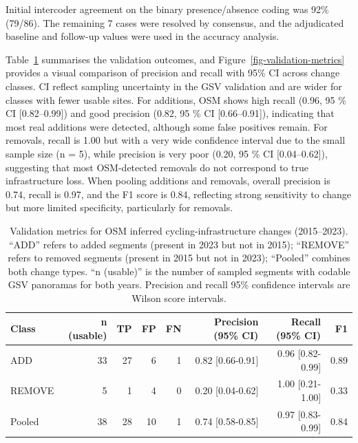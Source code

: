\documentclass[
]{article}
\begin{document}
Initial intercoder agreement on the binary presence/absence coding was
92\% (79/86). The remaining 7 cases were resolved by consensus, and the
adjudicated baseline and follow-up values were used in the accuracy
analysis.

Table~\ref{tbl-validation} summarises the validation outcomes, and
Figure~\ref{fig-validation-metrics} provides a visual comparison of
precision and recall with 95\% CI across change classes. CI reflect
sampling uncertainty in the GSV validation and are wider for classes
with fewer usable sites. For additions, OSM shows high recall (0.96, 95
\% CI {[}0.82--0.99{]}) and good precision (0.82, 95 \% CI
{[}0.66--0.91{]}), indicating that most real additions were detected,
although some false positives remain. For removals, recall is 1.00 but
with a very wide confidence interval due to the small sample size (n =
5), while precision is very poor (0.20, 95 \% CI {[}0.04--0.62{]}),
suggesting that most OSM-detected removals do not correspond to true
infrastructure loss. When pooling additions and removals, overall
precision is 0.74, recall is 0.97, and the F1 score is 0.84, reflecting
strong sensitivity to change but more limited specificity, particularly
for removals.

\begin{longtable}[t]{>{\raggedright\arraybackslash}p{2 cm}rrrrrrr}

\caption{\label{tbl-validation}Validation metrics for OSM inferred
cycling-infrastructure changes (2015--2023). ``ADD'' refers to added
segments (present in 2023 but not in 2015); ``REMOVE'' refers to removed
segments (present in 2015 but not in 2023); ``Pooled'' combines both
change types. ``n (usable)'' is the number of sampled segments with
codable GSV panoramas for both years. Precision and recall 95\%
confidence intervals are Wilson score intervals.}

\tabularnewline

\toprule
Class & n (usable) & TP & FP & FN & Precision (95\% CI) & Recall (95\% CI) & F1\\
\midrule
ADD & 33 & 27 & 6 & 1 & 0.82 [0.66-0.91] & 0.96 [0.82-0.99] & 0.89\\
REMOVE & 5 & 1 & 4 & 0 & 0.20 [0.04-0.62] & 1.00 [0.21-1.00] & 0.33\\
Pooled & 38 & 28 & 10 & 1 & 0.74 [0.58-0.85] & 0.97 [0.83-0.99] & 0.84\\
\bottomrule

\end{longtable}
\end{document}
